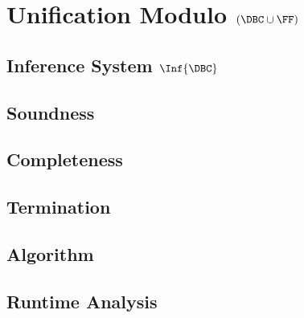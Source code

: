 \chapter{Unification Modulo \texorpdfstring{$(\DBC \cup \FF)$}{(DBC U F)}}\label{chap:unif-dbcuh}

\section{Inference System \texorpdfstring{$\Inf{\DBC}$}{IDBC}}\label{sec:inf-dbc}

\section{Soundness}\label{sec:dbc-soundness}

\section{Completeness}\label{sec:dbc-completeness}

\section{Termination}\label{sec:dbc-termination}

\section{Algorithm}\label{sec:dbc-algorithm}

\section{Runtime Analysis}\label{sec:dbc-runtime-analysis}

